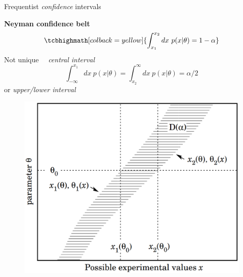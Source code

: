 \documentclass[
aspectratio=169,
14pt,
professionalfonts
]{beamer}
\newcommand{\arrow}{~\ding{220}~}
\begin{document}
\begin{frame}{Frequentist \textit{confidence} intervals}

\begin{minipage}[t]{0.55\linewidth}
\textbf{Neyman confidence belt}
$$
\tcbhighmath[colback=yellow]{
\int_{x_1}^{x_2} dx ~ p(x|\theta) = 1-\alpha
}
$$
Not unique \arrow \textit{central interval}
\small
$$
\int_{-\infty}^{x_1} dx ~ p(x|\theta)=  \int_{x_2}^{\infty} dx ~ p(x|\theta) = \alpha/2
$$
\normalsize
or \textit{upper/lower interval}
\end{minipage}
\begin{minipage}[t]{0.44\linewidth}
    \begin{figure}
        \centering
        \href{https://images.app.goo.gl/mSGttC2DUfsXm2RN8}{
        \includegraphics[width=\linewidth]{../plots/neyman.png}
        }
    \end{figure}
\end{minipage}
\end{frame}
\end{document}

